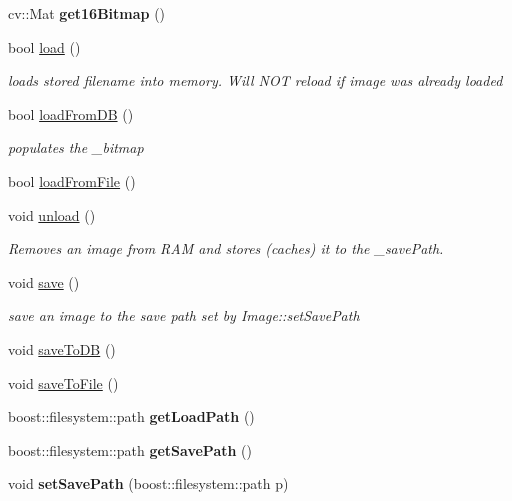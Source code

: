 \begin{DoxyCompactItemize}
\item 
cv\+::\+Mat {\bfseries get16\+Bitmap} ()\hypertarget{classImage_aa8aebc050b89bbaae627c12880b6088d}{}\label{classImage_aa8aebc050b89bbaae627c12880b6088d}

\item 
bool \hyperlink{classImage_a1a393960f7402515428bd982c32f59af}{load} ()
\begin{DoxyCompactList}\small\item\em loads stored filename into memory. Will N\+OT reload if image was already loaded \end{DoxyCompactList}\item 
bool \hyperlink{classImage_a37b7fbb0e61bf13f86557f507478ac38}{load\+From\+DB} ()
\begin{DoxyCompactList}\small\item\em populates the \+\_\+bitmap \end{DoxyCompactList}\item 
bool \hyperlink{classImage_a23899e8362a6755cc51f46fd490881ba}{load\+From\+File} ()
\item 
void \hyperlink{classImage_a4197ac415ed55494d21d9fae506ee806}{unload} ()
\begin{DoxyCompactList}\small\item\em Removes an image from R\+AM and stores (caches) it to the \+\_\+save\+Path. \end{DoxyCompactList}\item 
void \hyperlink{classImage_a643d9f46961e8372b6a573246aad66d1}{save} ()
\begin{DoxyCompactList}\small\item\em save an image to the save path set by Image\+::set\+Save\+Path \end{DoxyCompactList}\item 
void \hyperlink{classImage_a8d3bca1c0c20e4a8740b883f3f61bd87}{save\+To\+DB} ()
\item 
void \hyperlink{classImage_a94e5fcd0ba589d8187393d230d15b83d}{save\+To\+File} ()
\item 
boost\+::filesystem\+::path {\bfseries get\+Load\+Path} ()\hypertarget{classImage_a6269eaa2758e10a6644e68bc878fdec6}{}\label{classImage_a6269eaa2758e10a6644e68bc878fdec6}

\item 
boost\+::filesystem\+::path {\bfseries get\+Save\+Path} ()\hypertarget{classImage_ac6f982ea176c5d1fd95cfded780bb8de}{}\label{classImage_ac6f982ea176c5d1fd95cfded780bb8de}

\item 
void {\bfseries set\+Save\+Path} (boost\+::filesystem\+::path p)\hypertarget{classImage_ae7533f776abe2e1b4e6681985ba66aab}{}\label{classImage_ae7533f776abe2e1b4e6681985ba66aab}


\end{DoxyCompactItemize}
